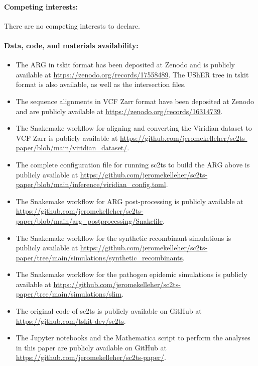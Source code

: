 \documentclass[12pt]{article}
\begin{document}
\paragraph*{Competing interests:}
There are no competing interests to declare.

\paragraph*{Data, code, and materials availability:}
\begin{itemize}
\item The ARG in tskit format has been deposited at Zenodo and is publicly
available at \url{https://zenodo.org/records/17558489}. The UShER tree
in tskit format is also available, as well as the intersection files.
\item The sequence alignments in VCF Zarr format have been deposited at
Zenodo and are publicly available at \url{https://zenodo.org/records/16314739}.
\item The Snakemake workflow for aligning and converting the Viridian dataset to VCF Zarr is publicly available at \url{https://github.com/jeromekelleher/sc2ts-paper/blob/main/viridian\_dataset/}.
\item The complete configuration file for running sc2ts to build the ARG above is
publicly available at \url{https://github.com/jeromekelleher/sc2ts-paper/blob/main/inference/viridian\_config.toml}.
\item The Snakemake workflow for ARG post-processing is publicly
available at \url{https://github.com/jeromekelleher/sc2ts-paper/blob/main/arg_postprocessing/Snakefile}.
\item The Snakemake workflow for the synthetic recombinant simulations is publicly
available at \url{https://github.com/jeromekelleher/sc2ts-paper/tree/main/simulations/synthetic_recombinants}.
\item The Snakemake workflow for the pathogen epidemic simulations is publicly
available at \url{https://github.com/jeromekelleher/sc2ts-paper/tree/main/simulations/slim}.
\item The original code of sc2ts is publicly available on
GitHub at \url{https://github.com/tskit-dev/sc2ts}.
\item The Jupyter notebooks and the Mathematica script to perform the analyses in this paper are publicly available on GitHub at \url{https://github.com/jeromekelleher/sc2ts-paper/}.
\end{itemize}


\end{document}
